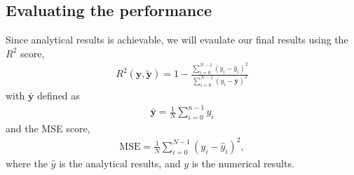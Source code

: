 \begin{appendices}
\section{Evaluating the performance}
Since analytical results is achievable, we will evaulate our final results using the $R^2$ score,
\begin{align}
    R^2(\bm{y},\tilde{\bm{y}}) = 1 - \frac{\sum_{i=0}^{N-1}(y_i - \hat{y}_i)^2}{\sum_{i=0}^{N-1}(y_i - \bar{\bm{y}})^2}
    \label{eq:r2}
\end{align}
with $\bar{\bm{y}}$ defined as 
\begin{align*}
    \bar{\bm{y}} = \frac{1}{N}\sum^{n-1}_{i=0} y_i
\end{align*}
and the MSE score,
\begin{align}
    \mathrm{MSE} = \frac{1}{N} \sum^{N-1}_{i=0} (y_i - \hat{y}_i)^2,
    \label{eq:mse}
\end{align}
where the $\hat{y}$ is the analytical results, and $y$ is the numerical results.
\end{appendices}